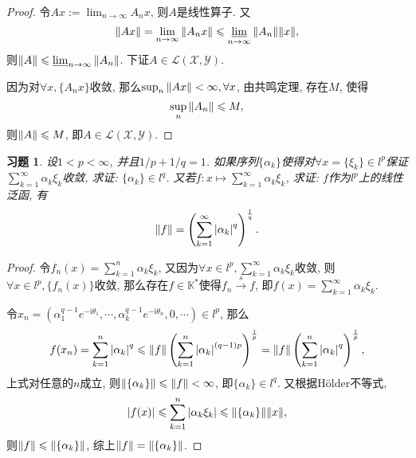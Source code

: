 \documentclass[a4paper,oneside,12pt]{ctexart}
\theoremstyle{plain}
\newtheorem{exercise}{习题}
\theoremstyle{nonumberplain}
\theoremstyle{nonumberplain}
\newtheorem{proof}{证明}
\newcommand{\sX}{\mathscr{X}}
\newcommand{\sY}{\mathscr{Y}}
\newcommand{\K}{\mathbb{K}}
\renewcommand{\i}{\mathrm{i}}
\renewcommand{\liminf}{\varliminf}
\newcommand{\sL}{\mathscr{L}}
\begin{document}
    \begin{proof}
        令$Ax:=\lim_{n\to\infty}A_nx$, 则$A$是线性算子. 又 
        \begin{equation*}
            \norm{Ax}=\lim_{n\to\infty}\norm{A_n x}\leqslant \liminf_{n\to\infty}\norm{A_n}\norm{x}, 
        \end{equation*}
        则$\norm{A}\leqslant \liminf_{n\to\infty}\norm{A_n}$. 下证$A\in\sL(\sX,\sY)$.

        因为对$\forall x,\{A_nx\}$收敛, 那么$\sup_{n}\norm{Ax}<\infty,\forall x$, 由共鸣定理, 存在$M$, 使得 
        \begin{equation*}
            \sup_n\norm{A_n}\leqslant M,
        \end{equation*}
        则$\norm{A}\leqslant M$, 即$A\in\sL(\sX,\sY)$.
    \end{proof}

    \begin{exercise}
        \label{ex:2.3.8}
        设$1<p<\infty$, 并且$1/p+1/q=1$. 如果序列$\{\alpha_k\}$使得对$\forall x=\{\xi_k\}\in l^p$保证$\sum_{k=1}^\infty \alpha_k\xi_k$收敛, 
        求证: $\{\alpha_k\}\in l^q$. 又若$f:x\mapsto\sum_{k=1}^\infty\alpha_k\xi_k$, 求证: $f$作为$l^p$上的线性泛函, 有 
        \begin{equation*}
            \norm{f}=\left(\sum_{k=1}^\infty\abs{\alpha_k}^q\right)^{\frac{1}{q}}.
        \end{equation*}
    \end{exercise}

    \begin{proof}
        令$f_n(x)=\sum_{k=1}^n\alpha_k\xi_k$, 又因为$\forall x\in l^p,\sum_{k=1}^\infty\alpha_k\xi_k$收敛, 则$\forall x\in l^p,\{f_n(x)\}$收敛, 
        那么存在$f\in\K^\ast$使得$f_n\overset{s}{\to}f$, 即$f(x)=\sum_{k=1}^\infty \alpha_k\xi_k$. 

        令$x_n=\left(\alpha_1^{q-1}e^{-\i\theta_1},\cdots,\alpha_k^{q-1}e^{-\i\theta_n},0,\cdots\right)\in l^p$, 那么 
        \begin{equation*}
            f(x_n)=\sum_{k=1}^n\abs{\alpha_k}^q\leqslant \norm{f}\left(\sum_{k=1}^n\abs{\alpha_k}^{(q-1)p}\right)^{\frac{1}{p}}=\norm{f}\left(\sum_{k=1}^n\abs{\alpha_k}^q\right)^{\frac{1}{p}},
        \end{equation*}
        上式对任意的$n$成立, 则$\norm{\{\alpha_k\}}\leqslant\norm{f}<\infty$, 即$\{\alpha_k\}\in l^q$. 又根据H\"older不等式, 
        \begin{equation*}
            \abs{f(x)}\leqslant\sum_{k=1}^n\abs{\alpha_k\xi_k}\leqslant \norm{\{\alpha_k\}}\norm{x},
        \end{equation*}
        则$\norm{f}\leqslant \norm{\{\alpha_k\}}$, 综上$\norm{f}=\norm{\{\alpha_k\}}$.
    \end{proof}
\end{document}
